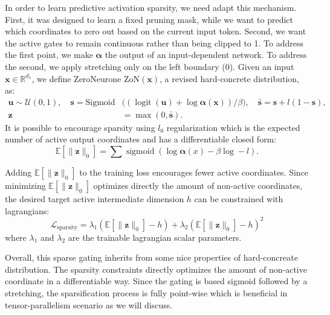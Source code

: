 \documentclass{article} %
\begin{document}
In order to learn predictive activation sparsity, we need adapt this mechanism.
First, it was designed to learn a fixed pruning mask, while we want to predict which
coordinates to zero out based on the current input token.
Second, we want the active gates to remain continuous rather than being clipped to 1.
To address the first point, we make $\boldsymbol{\alpha}$ the output of an input-dependent network.
To address the second, we apply stretching only on the left boundary ($0$).
Given an input $\textbf{x} \in \mathbb{R}^{d_1}$, 
we define ZeroNeurone ${\mathrm{ZoN}}(\mathbf{x})$, a revised hard-concrete distribution, as:
\begin{align}
    \mathbf{u} \sim \mathcal{U}(0, 1), \quad \mathbf{s} = \text{Sigmoid}& \big((\operatorname{logit}(\mathbf{u}) + \log \boldsymbol{\alpha}(\textbf{x})) / \beta\big), \quad \bar{\mathbf{s}} = \mathbf{s} + l(1 - \mathbf{s}),\\
    \mathbf{z} & = \max(0, \bar{\mathbf{s}}).
\end{align}
It is possible to encourage sparsity using $l_0$ regularization
which is the expected number of active output coordinates and has a differentiable closed form:
\begin{equation}
    \mathbb{E}\!\left[\|\mathbf{z}\|_0\right] = \sum
    \operatorname{sigmoid}\!\left(\log\boldsymbol{\alpha}(x)-\beta\log -l\right).
\end{equation}

Adding $\mathbb{E}[\|\mathbf{z}\|_0]$ to the training loss encourages fewer active coordinates.
Since minimizing $\mathbb{E}\!\left[\|\mathbf{z}\|_0\right]$ optimizes directly the amount of non-active
coordinates, the desired target active intermediate dimension $h$ can be constrained with lagrangians:
\begin{equation}
    \label{eq:lg}
    \mathcal{L}_{\text{sparsity}} = \lambda_1 (\mathbb{E}\!\left[\|\mathbf{z}\|_0\right] - h) + \lambda_2 {(\mathbb{E}\!\left[\|\mathbf{z}\|_0\right] - h)}^2 
\end{equation}
where $\lambda_1$ and $\lambda_2$ are the trainable lagrangian scalar parameters.

Overall, this sparse gating inherits from some nice properties of hard-concreate distribution.
The sparsity constraints directly optimizes the amount of non-active coordinate in a
differentiable way. Since the gating is based sigmoid followed by a stretching, the sparsification
process is fully point-wise which is beneficial in tensor-parallelism scenario as we will discuss.
\end{document}

